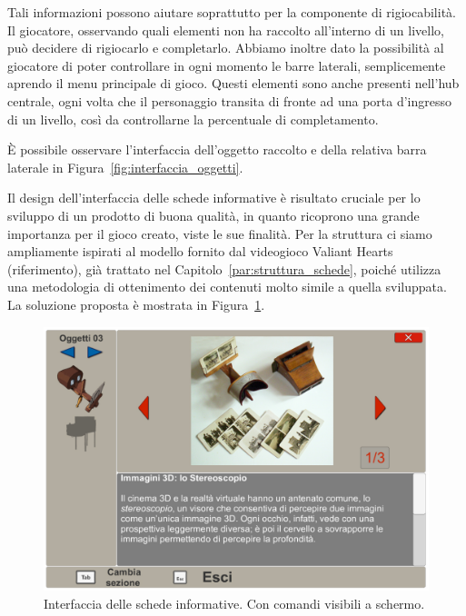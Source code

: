 Tali informazioni possono aiutare soprattutto per la componente di rigiocabilità. Il giocatore, osservando quali elementi non ha raccolto all’interno di un livello, può decidere di rigiocarlo e completarlo.
Abbiamo inoltre dato la possibilità al giocatore di poter controllare in ogni momento le barre laterali, semplicemente aprendo il menu principale di gioco.
Questi elementi sono anche presenti nell’hub centrale, ogni volta che il personaggio transita di fronte ad una porta d’ingresso di un livello, così da controllarne la percentuale di completamento.

È possibile osservare l'interfaccia dell'oggetto raccolto e della relativa barra laterale in Figura~\ref{fig:interfaccia_oggetti}.

Il design dell’interfaccia delle schede informative è risultato cruciale per lo sviluppo di un prodotto di buona qualità, in quanto ricoprono una grande importanza per il gioco creato, viste le sue finalità.
Per la struttura ci siamo ampliamente ispirati al modello fornito dal videogioco Valiant Hearts (riferimento), già trattato nel Capitolo~\ref{par:struttura_schede}, poiché utilizza una metodologia di ottenimento dei contenuti molto simile a quella sviluppata.
La soluzione proposta è mostrata in Figura~\ref{fig:interfaccia_schede}.

\begin{figure}%
	\centering
	\includegraphics[width= 0.9\columnwidth]{images/gameDesign/58_interfaccia.jpg}
	\caption{Interfaccia delle schede informative. Con comandi visibili a schermo.}
	\label{fig:interfaccia_schede}
\end{figure}


